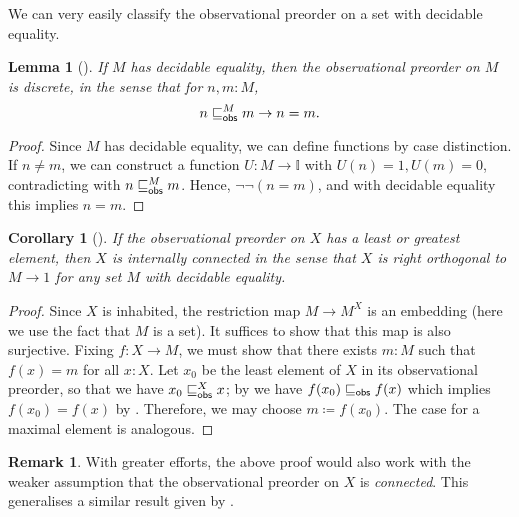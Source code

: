 \documentclass[a4paper,12pt]{amsart}
\newtheorem{lemma}[theorem]{Lemma}
\newtheorem{corollary}[theorem]{Corollary}
\theoremstyle{definition}
\newtheorem{remark}[theorem]{Remark}
\newcommand{\mbb}[1]{\mathbb{#1}}
\newcommand{\I}{\mbb I}
\begin{document}
We can very easily classify the observational preorder on a set with decidable equality.

\begin{lemma}[\AxiomNT]\label{lem:obs-preord-on-set-with-decidable-equality}
  If $M$ has decidable equality, then the observational preorder on $M$ is discrete, in the sense that for $n,m : M$,
  \[ n \obsle[M] m \to n = m\text{.} \]
\end{lemma}
\begin{proof}
  Since $M$ has decidable equality, we can define functions by case distinction. If $n \neq m$, we can construct a function $U : M \to \I$ with $U(n) = 1,U(m) = 0$, contradicting with $n \obsle[M] m$. Hence, $\neg\neg (n=m)$, and with decidable equality this implies $n = m$.
\end{proof}


\begin{corollary}[\AxiomNT]\label{cor:connectedpreservediscrete}
  If the observational preorder on $X$ has a least or greatest element, then $X$ is \emph{internally connected} in the sense that $X$ is right orthogonal to $M \to 1$ for any set $M$ with decidable equality.
\end{corollary}
\begin{proof}
  Since $X$ is inhabited, the restriction map $M \to M^X$ is an embedding (here we use the fact that $M$ is a set). It suffices to show that this map is also surjective.
  Fixing $f\colon X\to M$, we must show that there exists $m:M$ such that $f(x) = m$ for all $x:X$. Let $x_0$ be the least element of $X$ in its observational preorder, so that we have $x_0\obsle[X] x$; by  we have $f(x_0) \obsle f(x)$ which implies $f(x_0) = f(x)$ by . Therefore, we may choose $m\coloneq f(x_0)$. The case for a maximal element is analogous.
\end{proof}

\begin{remark}
  With greater efforts, the above proof would also work with the weaker assumption that the observational preorder on $X$ is \emph{connected}. This generalises a similar result given by \citet[Prop.~4.4.1]{hyland1990first}.
\end{remark}
\end{document}
